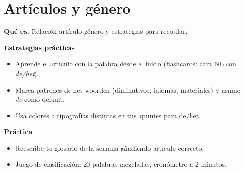 \section{Artículos y género}
\textbf{Qué es:} Relación artículo-género y estrategias para recordar.

\textbf{Estrategias prácticas}
\begin{itemize}[leftmargin=*]
  \item Aprende el artículo con la palabra desde el inicio (flashcards: cara NL con \textit{de/het}).
  \item Marca patrones de het-woorden (diminutivos, idiomas, materiales) y asume \textit{de} como default.
  \item Usa colores o tipografías distintas en tus apuntes para de/het.
\end{itemize}

\textbf{Práctica}
\begin{itemize}[leftmargin=*]
  \item Reescribe tu glosario de la semana añadiendo artículo correcto.
  \item Juego de clasificación: 20 palabras mezcladas, cronómetro a 2 minutos.
\end{itemize}
